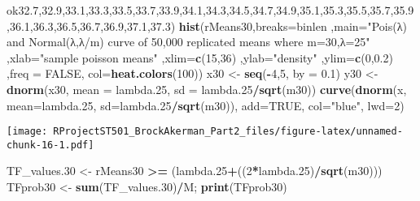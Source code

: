 \documentclass[
]{article}
\newenvironment{Shaded}{\begin{snugshade}}{\end{snugshade}}
\newcommand{\DataTypeTok}[1]{\textcolor[rgb]{0.13,0.29,0.53}{#1}}
\newcommand{\DecValTok}[1]{\textcolor[rgb]{0.00,0.00,0.81}{#1}}
\newcommand{\FloatTok}[1]{\textcolor[rgb]{0.00,0.00,0.81}{#1}}
\newcommand{\KeywordTok}[1]{\textcolor[rgb]{0.13,0.29,0.53}{\textbf{#1}}}
\newcommand{\NormalTok}[1]{#1}
\newcommand{\OperatorTok}[1]{\textcolor[rgb]{0.81,0.36,0.00}{\textbf{#1}}}
\newcommand{\OtherTok}[1]{\textcolor[rgb]{0.56,0.35,0.01}{#1}}
\newcommand{\StringTok}[1]{\textcolor[rgb]{0.31,0.60,0.02}{#1}}
\begin{document}
\begin{Shaded}
\begin{Highlighting}[]
ok{32.7}\NormalTok{,}\FloatTok{32.9}\NormalTok{,}\FloatTok{33.1}\NormalTok{,}\FloatTok{33.3}\NormalTok{,}\FloatTok{33.5}\NormalTok{,}\FloatTok{33.7}\NormalTok{,}\FloatTok{33.9}\NormalTok{,}\FloatTok{34.1}\NormalTok{,}\FloatTok{34.3}\NormalTok{,}\FloatTok{34.5}\NormalTok{,}\FloatTok{34.7}\NormalTok{,}\FloatTok{34.9}\NormalTok{,}\FloatTok{35.1}\NormalTok{,}\FloatTok{35.3}\NormalTok{,}\FloatTok{35.5}\NormalTok{,}\FloatTok{35.7}\NormalTok{,}\FloatTok{35.9}\NormalTok{,}\FloatTok{36.1}\NormalTok{,}\FloatTok{36.3}\NormalTok{,}\FloatTok{36.5}\NormalTok{,}\FloatTok{36.7}\NormalTok{,}\FloatTok{36.9}\NormalTok{,}\FloatTok{37.1}\NormalTok{,}\FloatTok{37.3}\NormalTok{)}
\KeywordTok{hist}\NormalTok{(rMeans30,}\DataTypeTok{breaks=}\NormalTok{binlen ,}\DataTypeTok{main=}\StringTok{"Pois(λ) and Normal(λ,λ/m) curve of 50,000 replicated means where m=30,λ=25"}\NormalTok{  ,}\DataTypeTok{xlab=}\StringTok{"sample poisson means"}\NormalTok{ ,}\DataTypeTok{xlim=}\KeywordTok{c}\NormalTok{(}\DecValTok{15}\NormalTok{,}\DecValTok{36}\NormalTok{) }
\NormalTok{     ,}\DataTypeTok{ylab=}\StringTok{"density"}\NormalTok{ ,}\DataTypeTok{ylim=}\KeywordTok{c}\NormalTok{(}\DecValTok{0}\NormalTok{,}\FloatTok{0.2}\NormalTok{) ,}\DataTypeTok{freq =} \OtherTok{FALSE}\NormalTok{, }\DataTypeTok{col=}\KeywordTok{heat.colors}\NormalTok{(}\DecValTok{100}\NormalTok{))}
\NormalTok{x30 <-}\StringTok{ }\KeywordTok{seq}\NormalTok{(}\OperatorTok{-}\DecValTok{4}\NormalTok{,}\DecValTok{5}\NormalTok{, }\DataTypeTok{by =} \FloatTok{0.1}\NormalTok{)}
\NormalTok{y30 <-}\StringTok{ }\KeywordTok{dnorm}\NormalTok{(x30, }\DataTypeTok{mean =}\NormalTok{ lambda}\FloatTok{.25}\NormalTok{, }\DataTypeTok{sd =}\NormalTok{ lambda}\FloatTok{.25}\OperatorTok{/}\KeywordTok{sqrt}\NormalTok{(m30))}
\KeywordTok{curve}\NormalTok{(}\KeywordTok{dnorm}\NormalTok{(x, }\DataTypeTok{mean=}\NormalTok{lambda}\FloatTok{.25}\NormalTok{, }\DataTypeTok{sd=}\NormalTok{lambda}\FloatTok{.25}\OperatorTok{/}\KeywordTok{sqrt}\NormalTok{(m30)), }\DataTypeTok{add=}\OtherTok{TRUE}\NormalTok{, }\DataTypeTok{col=}\StringTok{"blue"}\NormalTok{, }\DataTypeTok{lwd=}\DecValTok{2}\NormalTok{)}
\end{Highlighting}
\end{Shaded}

\texttt{[image: RProjectST501\_BrockAkerman\_Part2\_files/figure-latex/unnamed-chunk-16-1.pdf]}

\begin{Shaded}
\begin{Highlighting}[]
\NormalTok{TF_values}\FloatTok{.30}\NormalTok{ <-}\StringTok{ }\NormalTok{rMeans30 }\OperatorTok{>=}\StringTok{ }\NormalTok{(lambda}\FloatTok{.25}\OperatorTok{+}\NormalTok{((}\DecValTok{2}\OperatorTok{*}\NormalTok{lambda}\FloatTok{.25}\NormalTok{)}\OperatorTok{/}\KeywordTok{sqrt}\NormalTok{(m30)))}
\NormalTok{TFprob30 <-}\StringTok{ }\KeywordTok{sum}\NormalTok{(TF_values}\FloatTok{.30}\NormalTok{)}\OperatorTok{/}\NormalTok{M; }\KeywordTok{print}\NormalTok{(TFprob30)}
\end{Highlighting}
\end{Shaded}
\end{document}
